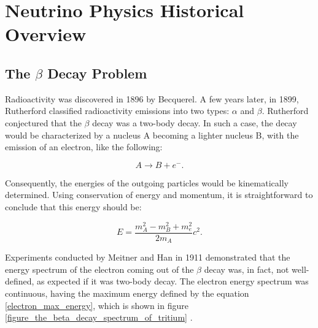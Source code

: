 \section{Neutrino Physics Historical Overview}
\label{Chapter:1}

\subsection{The $\beta$ Decay Problem}

Radioactivity was discovered in 1896 by Becquerel. A few years later, in 1899, Rutherford classified radioactivity emissions into two types: $\alpha$ and $\beta$. Rutherford conjectured that the $\beta$ decay was a two-body decay. In such a case, the decay would be characterized by a nucleus A becoming a lighter nucleus B, with the emission of an electron, like the following:

\begin{equation}
	A \longrightarrow B + e^- .
\end{equation}

Consequently, the energies of the outgoing particles would be kinematically determined. 
Using conservation of energy and momentum, it is straightforward to conclude that this energy should be:

\begin{equation}
	E = \frac{m_A^2 - m_B^2 + m_e^2}{2m_A} c^2.
	\label{electron_max_energy} 
\end{equation}

Experiments conducted by Meitner and Han in 1911 demonstrated that the energy spectrum of the electron coming out of the $\beta$ decay was, in fact, not well-defined, as expected if it was two-body decay. The electron energy spectrum was continuous, having the maximum energy defined by the equation \ref{electron_max_energy}, which is shown in figure \ref{figure_the_beta_decay_spectrum_of_tritium} \cite{griffiths}.

